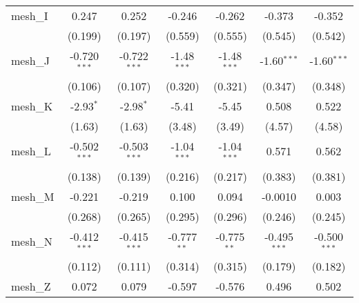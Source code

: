 \begin{tabular}{lcccccc}
   mesh\_I                                                     & 0.247          & 0.252          & -0.246         & -0.262         & -0.373         & -0.352\\   
                                                               & (0.199)        & (0.197)        & (0.559)        & (0.555)        & (0.545)        & (0.542)\\   
   mesh\_J                                                     & -0.720$^{***}$ & -0.722$^{***}$ & -1.48$^{***}$  & -1.48$^{***}$  & -1.60$^{***}$  & -1.60$^{***}$\\   
                                                               & (0.106)        & (0.107)        & (0.320)        & (0.321)        & (0.347)        & (0.348)\\   
   mesh\_K                                                     & -2.93$^{*}$    & -2.98$^{*}$    & -5.41          & -5.45          & 0.508          & 0.522\\   
                                                               & (1.63)         & (1.63)         & (3.48)         & (3.49)         & (4.57)         & (4.58)\\   
   mesh\_L                                                     & -0.502$^{***}$ & -0.503$^{***}$ & -1.04$^{***}$  & -1.04$^{***}$  & 0.571          & 0.562\\   
                                                               & (0.138)        & (0.139)        & (0.216)        & (0.217)        & (0.383)        & (0.381)\\   
   mesh\_M                                                     & -0.221         & -0.219         & 0.100          & 0.094          & -0.0010        & 0.003\\   
                                                               & (0.268)        & (0.265)        & (0.295)        & (0.296)        & (0.246)        & (0.245)\\   
   mesh\_N                                                     & -0.412$^{***}$ & -0.415$^{***}$ & -0.777$^{**}$  & -0.775$^{**}$  & -0.495$^{***}$ & -0.500$^{***}$\\   
                                                               & (0.112)        & (0.111)        & (0.314)        & (0.315)        & (0.179)        & (0.182)\\   
   mesh\_Z                                                     & 0.072          & 0.079          & -0.597         & -0.576         & 0.496          & 0.502\\   

\end{tabular}
